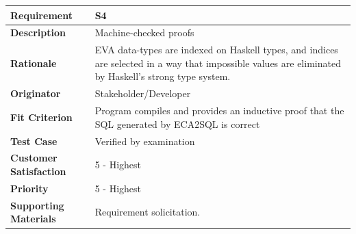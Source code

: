 \documentclass[12pt]{report}
\begin{document}
{\setlength{\tabcolsep}{6pt} %
    \begin{tabularx}{\textwidth}{>{\bfseries}m{3cm}X}
        Requirement & S4 \\ 
        \midrule
        \endhead
        Description  & Machine-checked proofs
        \\	Rationale & EVA data-types are indexed on Haskell types, and 
        indices are selected in a way that impossible values are eliminated by 
        Haskell's strong type system.
        \\	Originator & Stakeholder/Developer
        
        \\	Fit Criterion & Program compiles and provides an inductive proof 
        that the SQL generated by ECA2SQL is correct
        \\ Test Case & Verified by examination
        \\	Customer Satisfaction & 5 - Highest 
        \\	Priority & 5 - Highest 
        \\	Supporting Materials & Requirement solicitation.
        \vspace{12pt}
    \end{tabularx}
}
\end{document}
